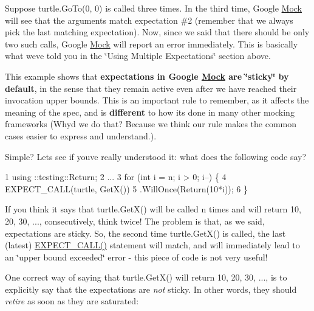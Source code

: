 

Suppose {\ttfamily turtle.\+Go\+To(0, 0)} is called three times. In the third time, Google \hyperlink{class_mock}{Mock} will see that the arguments match expectation \#2 (remember that we always pick the last matching expectation). Now, since we said that there should be only two such calls, Google \hyperlink{class_mock}{Mock} will report an error immediately. This is basically what we\textquotesingle{}ve told you in the \char`\"{}\+Using Multiple Expectations\char`\"{} section above.

This example shows that {\bfseries expectations in Google \hyperlink{class_mock}{Mock} are \char`\"{}sticky\char`\"{} by default}, in the sense that they remain active even after we have reached their invocation upper bounds. This is an important rule to remember, as it affects the meaning of the spec, and is {\bfseries different} to how it\textquotesingle{}s done in many other mocking frameworks (Why\textquotesingle{}d we do that? Because we think our rule makes the common cases easier to express and understand.).

Simple? Let\textquotesingle{}s see if you\textquotesingle{}ve really understood it\+: what does the following code say?


\begin{DoxyCode}
1 using ::testing::Return;
2 ...
3 for (int i = n; i > 0; i--) \{
4   EXPECT\_CALL(turtle, GetX())
5       .WillOnce(Return(10*i));
6 \}
\end{DoxyCode}


If you think it says that {\ttfamily turtle.\+Get\+X()} will be called {\ttfamily n} times and will return 10, 20, 30, ..., consecutively, think twice! The problem is that, as we said, expectations are sticky. So, the second time {\ttfamily turtle.\+Get\+X()} is called, the last (latest) {\ttfamily \hyperlink{gmock-spec-builders_8h_a535a6156de72c1a2e25a127e38ee5232}{E\+X\+P\+E\+C\+T\+\_\+\+C\+A\+L\+L()}} statement will match, and will immediately lead to an \char`\"{}upper bound exceeded\char`\"{} error -\/ this piece of code is not very useful!

One correct way of saying that {\ttfamily turtle.\+Get\+X()} will return 10, 20, 30, ..., is to explicitly say that the expectations are {\itshape not} sticky. In other words, they should {\itshape retire} as soon as they are saturated\+:


